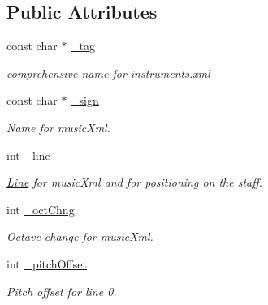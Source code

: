 \subsection*{Public Attributes}
\begin{DoxyCompactItemize}
\item 
\mbox{\label{class_ms_1_1_clef_info_a89cfdea1c40dde7dd0c959d5d0f359a1}} 
const char $\ast$ \hyperlink{class_ms_1_1_clef_info_a89cfdea1c40dde7dd0c959d5d0f359a1}{\+\_\+tag}
\begin{DoxyCompactList}\small\item\em comprehensive name for instruments.\+xml \end{DoxyCompactList}\item 
\mbox{\label{class_ms_1_1_clef_info_aeab4ba511084e33fdfb3d01705e91309}} 
const char $\ast$ \hyperlink{class_ms_1_1_clef_info_aeab4ba511084e33fdfb3d01705e91309}{\+\_\+sign}
\begin{DoxyCompactList}\small\item\em Name for music\+Xml. \end{DoxyCompactList}\item 
\mbox{\label{class_ms_1_1_clef_info_a90d644d265b421e6ca191d7149d853ca}} 
int \hyperlink{class_ms_1_1_clef_info_a90d644d265b421e6ca191d7149d853ca}{\+\_\+line}
\begin{DoxyCompactList}\small\item\em \hyperlink{class_ms_1_1_line}{Line} for music\+Xml and for positioning on the staff. \end{DoxyCompactList}\item 
\mbox{\label{class_ms_1_1_clef_info_ac9e6a656cd27ad4221f9537441bb1998}} 
int \hyperlink{class_ms_1_1_clef_info_ac9e6a656cd27ad4221f9537441bb1998}{\+\_\+oct\+Chng}
\begin{DoxyCompactList}\small\item\em Octave change for music\+Xml. \end{DoxyCompactList}\item 
\mbox{\label{class_ms_1_1_clef_info_ae6599597d5145fff9ec7ed3024556359}} 
int \hyperlink{class_ms_1_1_clef_info_ae6599597d5145fff9ec7ed3024556359}{\+\_\+pitch\+Offset}
\begin{DoxyCompactList}\small\item\em Pitch offset for line 0. \end{DoxyCompactList}\item 

\end{DoxyCompactItemize}
